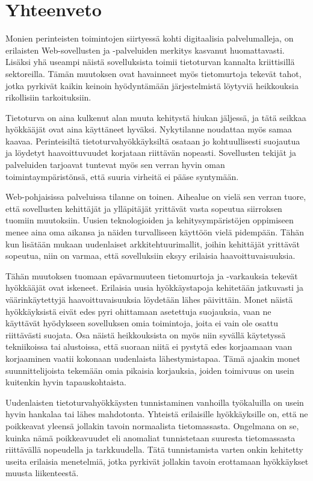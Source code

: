 
\chapter{Yhteenveto}

Monien perinteisten toimintojen siirtyessä kohti digitaalisia palvelumalleja, on erilaisten 
Web-sovellusten ja -palveluiden merkitys kasvanut huomattavasti. Lisäksi yhä useampi näistä sovelluksista
toimii tietoturvan kannalta kriittisillä sektoreilla.
Tämän muutoksen ovat havainneet myös tietomurtoja tekevät tahot, jotka pyrkivät kaikin
keinoin hyödyntämään järjestelmistä löytyviä heikkouksia rikollisiin tarkoituksiin.

Tietoturva on aina kulkenut alan muuta kehitystä hiukan jäljessä, ja tätä seikkaa hyökkääjät
ovat aina käyttäneet hyväksi. Nykytilanne noudattaa myös samaa kaavaa. Perinteisiltä
tietoturvahyökkäyksiltä osataan jo kohtuullisesti suojautua ja löydetyt haavoittuvuudet
korjataan riittävän nopeasti. Sovellusten tekijät ja palveluiden tarjoavat tuntevat
myös sen verran hyvin oman toimintaympäristönsä, että suuria virheitä ei pääse syntymään.

Web-pohjaisissa palveluissa tilanne on toinen. Aihealue on vielä sen verran tuore,
että sovellusten kehittäjät ja ylläpitäjät yrittävät vasta sopeutua siirroksen
tuomiin muutoksiin. Uusien teknologioiden ja kehitysympäristöjen oppimiseen
menee aina oma aikansa ja näiden turvalliseen käyttöön vielä pidempään. 
Tähän kun lisätään mukaan uudenlaiset arkkitehtuurimallit, joihin kehittäjät yrittävät 
sopeutua, niin on varmaa, että sovelluksiin eksyy erilaisia haavoittuvaisuuksia.

Tähän muutoksen tuomaan epävarmuuteen tietomurtoja ja -varkauksia tekevät hyökkääjät ovat iskeneet. 
Erilaisia uusia hyökkäystapoja kehitetään jatkuvasti ja väärinkäytettyjä haavoittuvaisuuksia löydetään lähes päivittäin.
Monet näistä hyökkäyksistä eivät edes pyri ohittamaan asetettuja suojauksia, vaan ne käyttävät hyödykseen
sovelluksen omia toimintoja, joita ei vain ole osattu riittävästi suojata. Osa näistä heikkouksista on 
myös niin syvällä käytetyssä tekniikoissa tai alustoissa, että suoraan niitä ei pystytä edes korjaamaan vaan
korjaaminen vaatii kokonaan uudenlaista lähestymistapaa. Tämä ajaakin monet suunnittelijoista tekemään
omia pikaisia korjauksia, joiden toimivuus on usein kuitenkin hyvin tapauskohtaista. 

Uudenlaisten tietoturvahyökkäysten tunnistaminen vanhoilla työkaluilla on usein hyvin hankalaa tai
lähes mahdotonta. Yhteistä erilaisille hyökkäyksille on, että ne poikkeavat yleensä jollakin tavoin normaalista
tietomassasta. Ongelmana on se, kuinka nämä poikkeavuudet eli anomaliat tunnistetaan suuresta tietomassasta
riittävällä nopeudella ja tarkkuudella. Tätä tunnistamista varten onkin kehitetty useita erilaisia menetelmiä,
jotka pyrkivät jollakin tavoin erottamaan hyökkäykset muusta liikenteestä. 

